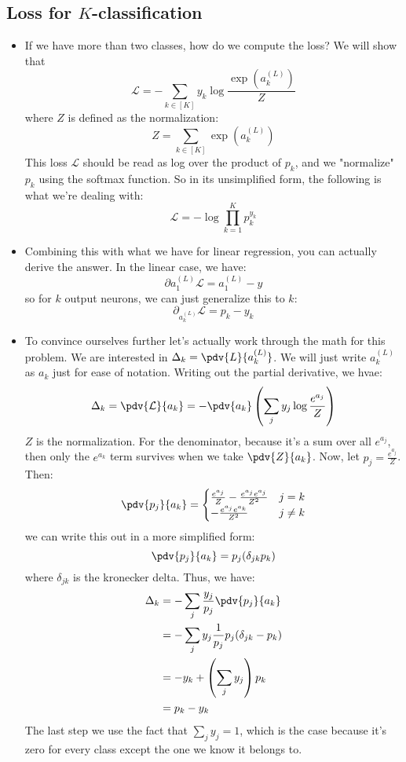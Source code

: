 \subsection{Loss for \( K \)-classification}
\begin{itemize}
	\item If we have more than two classes, how do we compute the loss? We will show
		that
		\[
			\mathcal{L} = -\sum_{k \in [K]} y_k \log \frac{\exp(a_k^{(L)})}{Z}
		\]
		where \( Z \) is defined as the normalization:
		\[
		Z = \sum_{k \in [K]} \exp(a_k^{(L)})
		\]
		This loss \( \mathcal{L} \) should be read as log over the product of \( p_k
		\), and we "normalize" \( p_k \) using the softmax function. So in its
		unsimplified form, the following is what we're dealing with: 
		\[
			\mathcal{L } = -\log \prod_{k = 1}^{K} p_k^{y_k}
		\]
	\item Combining this with what we have for linear regression, you can actually
		derive the answer. In the linear case, we have:
		\[
			\partial a_{1}^{(L)} \mathcal{L} = a_1^{(L)} - y
		\]
		so for \( k \) output neurons, we can just generalize this to \( k \):
		\[
			\partial_{a_k^{(L)}} \mathcal{L} = p_k - y_k
		\]
	\item To convince ourselves further let's actually work through the math for this
		problem. We are interested in \( \Delta_k = \pdv{L}{a_k^{(L)}} \). We will
		just write \( a_k^{(L)} \) as \( a_k \) just for ease of notation. Writing
		out the partial derivative, we hvae:
		\[
			\Delta_k = \pdv{\mathcal{L}}{a_k} = -\pdv{a_k} \left( \sum_j y_j \log
			\frac{e^{a_j}}{Z} \right)
		\]
		\( Z \) is the normalization. For the denominator, because it's a sum over
		all \( e^{a_j} \), then only the \( e^{a_k} \) term survives when we take \(
		\pdv{Z}{a_k}\). Now, let \( p_j = \frac{e^{a_j}}{Z} \). Then:
		\[
			\pdv{p_j}{a_k} = \begin{cases}
				\frac{e^{a_j}}{Z} - \frac{e^{a_j}e^{a_j}}{Z^2} & j = k\\
				-\frac{e^{a_j}e^{a_k}}{Z^2} & j \neq k
			\end{cases}
		\]
		we can write this out in a more simplified form:
		\[
			\pdv{p_j}{a_k} = p_j(\delta_{jk} p_k)
		\]
		where \( \delta_{jk} \) is the kronecker delta. Thus, we have:
		\begin{align*}
			\Delta_k &= - \sum_{j} \frac{y_j}{p_j} \pdv{p_j}{a_k}\\
			&= -\sum_j y_j \frac{1}{p_j}p_j(\delta_{jk} - p_k) \\ 
			&= -y_k + \left( \sum_j y_j \right) p_k\\
			&= p_k - y_k
		\end{align*}
		The last step we use the fact that \( \sum_j y_j = 1\), which is the case
		because it's zero for every class except the one we know it belongs to. 
\end{itemize}
